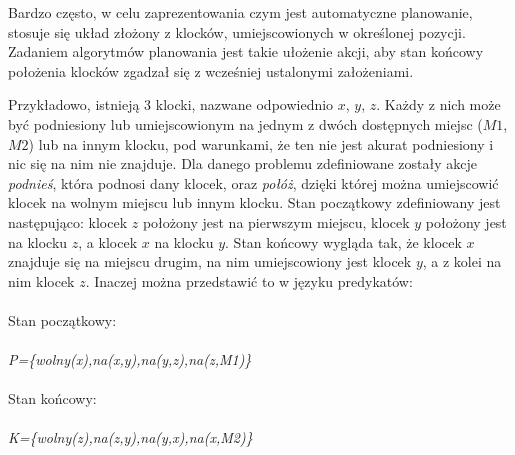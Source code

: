 Bardzo często, w celu zaprezentowania czym jest automatyczne planowanie, stosuje się układ złożony z klocków, umiejscowionych w określonej pozycji. Zadaniem algorytmów planowania jest takie ułożenie akcji, aby stan końcowy położenia klocków zgadzał się z wcześniej ustalonymi założeniami.

Przykładowo, istnieją 3 klocki, nazwane odpowiednio $x$, $y$, $z$. Każdy z nich może być podniesiony lub umiejscowionym na jednym z dwóch dostępnych miejsc ($M1$, $M2$) lub na innym klocku, pod warunkami, że ten nie jest akurat podniesiony i nic się na nim nie znajduje. Dla danego problemu zdefiniowane zostały akcje \emph{podnieś}, która podnosi dany klocek, oraz \emph{połóż}, dzięki której można umiejscowić klocek na wolnym miejscu lub innym klocku. Stan początkowy zdefiniowany jest następująco: klocek $z$ położony jest na pierwszym miejscu, klocek $y$ położony jest na klocku $z$, a klocek $x$ na klocku $y$. Stan końcowy wygląda tak, że klocek $x$ znajduje się na miejscu drugim, na nim umiejscowiony jest klocek $y$, a z kolei na nim klocek $z$. Inaczej można przedstawić to w języku predykatów:
\\\\
Stan początkowy:
\\\\
\textit{P=\{wolny(x),na(x,y),na(y,z),na(z,M1)\}}
\\\\
Stan końcowy:
\\\\
\textit{K=\{wolny(z),na(z,y),na(y,x),na(x,M2)\}}

